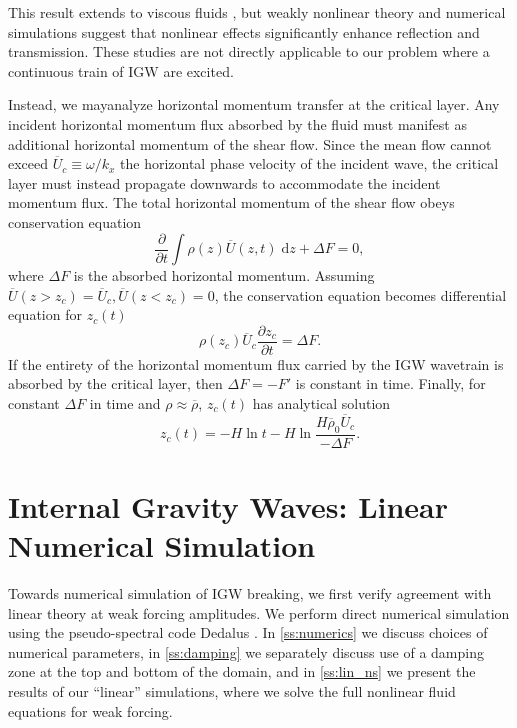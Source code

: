 \documentclass[
        fleqn,
        usenatbib,
    ]{mnras}
\newcommand*{\pd}[2]{\frac{\partial#1}{\partial#2}}
\begin{document}
This result extends to viscous fluids \citep{hazel}, but weakly nonlinear theory
\citep{brown_stewartson} and numerical simulations \citep{winters1994} suggest
that nonlinear effects significantly enhance reflection and transmission. These
studies are not directly applicable to our problem where a continuous train of
IGW are excited.

Instead, we mayanalyze horizontal momentum transfer at the critical layer. Any
incident horizontal momentum flux absorbed by the fluid must manifest as
additional horizontal momentum of the shear flow. Since the mean flow cannot
exceed $\overline{U}_c \equiv \omega/k_x$ the horizontal phase velocity of the
incident wave, the critical layer must instead propagate downwards to
accommodate the incident momentum flux. The total horizontal momentum of the
shear flow obeys conservation equation
\begin{equation}
    \pd{}{t}\int\limits \rho(z) \overline{U}(z, t)\;\mathrm{d}z
        + \Delta F = 0,
\end{equation}
where $\Delta F$ is the absorbed horizontal momentum. Assuming $\overline{U}(z >
z_c) = \overline{U}_c, \overline{U}(z < z_c) = 0$, the conservation equation
becomes differential equation for $z_c(t)$
\begin{equation}
    \rho(z_c) \overline{U}_c\pd{z_c}{t} = \Delta F.\label{eq:zc_anal}
\end{equation}
If the entirety of the horizontal momentum flux carried by the IGW wavetrain is
absorbed by the critical layer, then $\Delta F = -F'$ is constant in time.
Finally, for constant $\Delta F$ in time and $\rho \approx \overline{\rho}$,
$z_c(t)$ has analytical solution
\begin{equation}
    z_c(t) = -H\ln t - H\ln \frac{H\overline{\rho}_0\overline{U}_c}{-\Delta F}
        .\label{eq:zc_sol}
\end{equation}

\section{Internal Gravity Waves: Linear Numerical Simulation}\label{s:sim}

Towards numerical simulation of IGW breaking, we first verify agreement with
linear theory at weak forcing amplitudes. We perform direct numerical simulation
using the pseudo-spectral code Dedalus \citep{dedalus}. In \autoref{ss:numerics}
we discuss choices of numerical parameters, in \autoref{ss:damping} we
separately discuss use of a damping zone at the top and bottom of the domain,
and in \autoref{ss:lin_ns} we present the results of our ``linear'' simulations,
where we solve the full nonlinear fluid equations for weak forcing.
\end{document}
